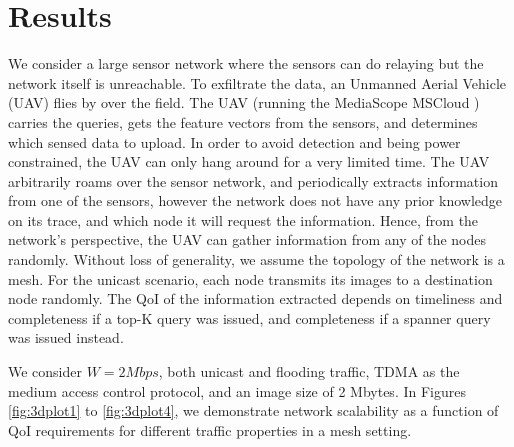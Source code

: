 
\section{Results}
\label{sec:results}

We consider a large sensor network where the sensors can do relaying but the network itself is unreachable. To exfiltrate the data, an Unmanned Aerial Vehicle (UAV) flies by over the field. The UAV (running the MediaScope MSCloud \cite{mediascope}) carries the queries, gets the feature vectors from the sensors, and determines which sensed data to upload. In order to avoid detection and being power constrained, the UAV can only hang around for a very limited time. The UAV arbitrarily roams over the sensor network, and periodically extracts information from one of the sensors, however the network does not have any prior knowledge on its trace, and which node it will request the information.  Hence, from the network's perspective, the UAV can gather information from any of the nodes randomly. Without loss of generality, we assume the topology of the network is a mesh. For the unicast scenario, each node transmits its images to a destination node randomly. The QoI of the information extracted depends on timeliness and completeness if a top-K query was issued, and completeness if a spanner query was issued instead. 

We consider $W= 2 Mbps$, both unicast and flooding traffic, TDMA as the medium access control protocol, and an image size of 2 Mbytes.  In Figures \ref{fig:3dplot1} to \ref{fig:3dplot4}, we demonstrate network scalability as a function of QoI requirements for different traffic properties in a mesh setting.

